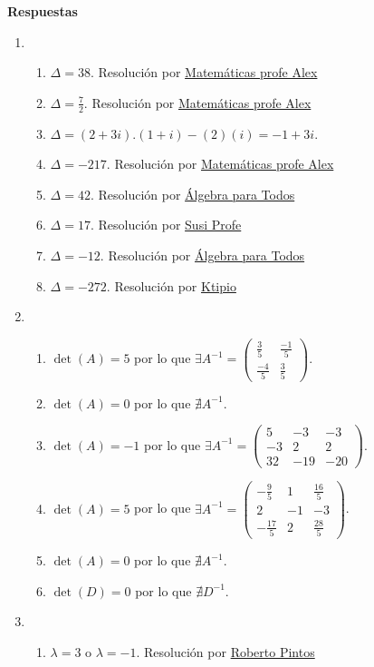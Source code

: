 \documentclass[a4paper]{article}
\newcommand{\exercise}{\item}
\begin{document}
 \textbf{Respuestas}\begin{enumerate}\exercise\begin{enumerate} [label=(\alph*)]		\item $\Delta=38$. Resolución por \href{https://youtu.be/bsUUVmeqsdY?t=104}{Matemáticas profe Alex}
		\item $\Delta=\frac{7}{2}$. Resolución por \href{https://youtu.be/bsUUVmeqsdY?t=237}{Matemáticas profe Alex}
		\item $\Delta=(2+3i).(1+i)-(2)(i)=-1+3i$. 
		\item $\Delta=-217$. Resolución por \href{https://youtu.be/8OnOZvc5rFQ}{Matemáticas profe Alex}
		\item $\Delta=42$. Resolución por \href{https://youtu.be/0iXeaZwPkzo}{Álgebra para Todos}
		\item $\Delta=17$. Resolución por \href{https://youtu.be/a264lpe7I_A?t=383}{Susi Profe}
		\item $\Delta=-12$. Resolución por \href{https://youtu.be/qDyeSvFMbTg}{Álgebra para Todos}
		\item $\Delta=-272$. Resolución por \href{https://youtu.be/fPIaDQ8TOs0}{Ktipio}
\end{enumerate}\exercise\begin{enumerate} [label=(\alph*)]		\item $\det(A)=5$ por lo que $\exists A^{-1}=\begin{pmatrix} \frac{3}{5} & \frac{-1}{5} \\ \frac{-4}{5} & \frac{3}{5} \end{pmatrix}$.
		\item $\det(A)=0$ por lo que $\nexists A^{-1}$.
		\item $\det(A)=-1$ por lo que $\exists A^{-1}=\begin{pmatrix} 5 & -3 & -3\\ -3 & 2 & 2 \\ 32 & -19 & -20 \end{pmatrix}$.
		\item $\det(A)=5$ por lo que $\exists A^{-1}=\begin{pmatrix} -\frac{9}{5} & 1 & \frac{16}{5}\\ 2 & -1 & -3 \\ -\frac{17}{5} & 2 & \frac{28}{5} \end{pmatrix}$.
		\item $\det(A)=0$ por lo que $\nexists A^{-1}$.
		\item $\det(D)=0$ por lo que $\nexists D^{-1}$.
\end{enumerate}\exercise\begin{enumerate} [label=(\alph*)]		\item $\lambda=3$ o $\lambda=-1$. Resolución por \href{https://youtu.be/Rw531O86QVw?t=376}{Roberto Pintos}

\end{enumerate}
\end{enumerate}
\end{document}
